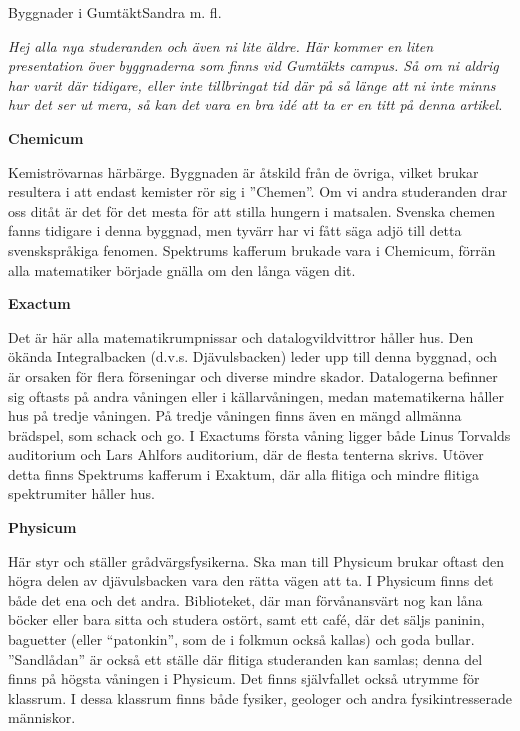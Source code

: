 \documentclass{spektraklet}
\begin{document}
\begin{artikel}{Byggnader i Gumtäkt}{Sandra m. fl.}

\textit{Hej alla nya studeranden och även ni lite äldre. Här kommer en liten presentation över byggnaderna som finns vid Gumtäkts campus. Så om ni aldrig har varit där tidigare,
eller inte tillbringat tid där på så länge att ni inte minns hur det ser ut mera, så kan
det vara en bra idé att ta er en titt på denna artikel.}


\textbf{Chemicum}

Kemiströvarnas härbärge. Byggnaden är åtskild från de övriga, vilket brukar resultera i att endast kemister rör sig i ”Chemen”. Om vi andra studeranden drar oss ditåt är det för det mesta för att stilla hungern i matsalen. Svenska chemen fanns tidigare i denna byggnad, men tyvärr har vi fått säga adjö till detta svenskspråkiga fenomen. Spektrums kafferum brukade vara i Chemicum, förrän alla matematiker började gnälla om den långa vägen dit.


\textbf{Exactum}

Det är här alla matematikrumpnissar och datalogvildvittror håller hus. Den ökända Integralbacken (d.v.s. Djävulsbacken) leder upp till denna byggnad, och är orsaken för flera förseningar och diverse mindre skador. Datalogerna befinner sig oftasts på andra våningen eller i källarvåningen, medan matematikerna håller hus på tredje våningen. På tredje våningen finns även en mängd allmänna brädspel, som schack och go. I Exactums första våning ligger både Linus Torvalds auditorium och Lars Ahlfors auditorium, där de flesta tenterna skrivs. Utöver detta finns Spektrums kafferum i Exaktum, där alla flitiga och mindre flitiga spektrumiter håller hus.


\textbf{Physicum}

Här styr och ställer grådvärgsfysikerna. Ska man till Physicum brukar oftast den högra delen av djävulsbacken vara den rätta vägen att ta. I Physicum finns det både det ena och det andra. Biblioteket, där man förvånansvärt nog kan låna böcker eller bara sitta och studera ostört, samt ett café, där det säljs paninin, baguetter (eller ``patonkin'', som de i folkmun också kallas) och goda bullar. ”Sandlådan” är också ett ställe där flitiga studeranden kan samlas; denna del finns på högsta våningen i Physicum. Det finns självfallet också utrymme för klassrum. I dessa klassrum finns både fysiker, geologer och andra fysikintresserade människor.


\end{artikel}
\end{document}
